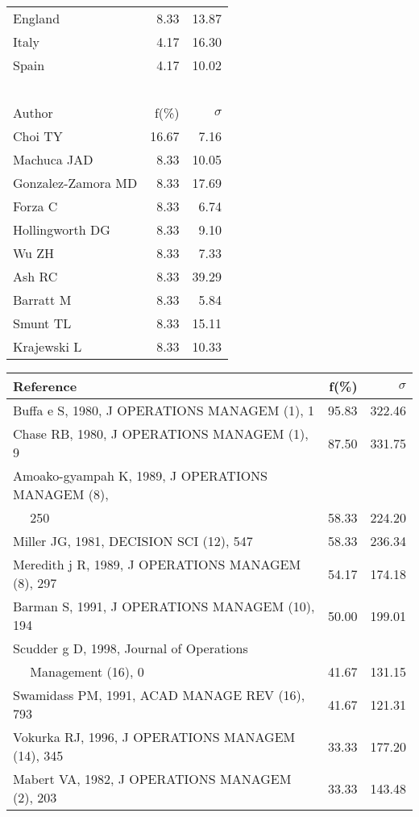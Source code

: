\documentclass[a4paper,11pt]{report}
\begin{document}
\begin{landscape}
\begin{table}[!ht]
{\begin{tabular}{|l r r|}
England & 8.33 & 13.87\\
Italy & 4.17 & 16.30\\
Spain & 4.17 & 10.02\\
 &  & \\
 &  & \\
 &  & \\
 &  & \\
 &  & \\
\hline
\hline
Author & f(\%) & $\sigma$\\
\hline
Choi TY & 16.67 & 7.16\\
Machuca JAD & 8.33 & 10.05\\
Gonzalez-Zamora MD & 8.33 & 17.69\\
Forza C & 8.33 & 6.74\\
Hollingworth DG & 8.33 & 9.10\\
Wu ZH & 8.33 & 7.33\\
Ash RC & 8.33 & 39.29\\
Barratt M & 8.33 & 5.84\\
Smunt TL & 8.33 & 15.11\\
Krajewski L & 8.33 & 10.33\\
\hline
\end{tabular}
}
{\scriptsize\begin{tabular}{|l r r|}
\hline
Reference & f(\%) & $\sigma$\\
\hline
Buffa e S, 1980, J OPERATIONS MANAGEM (1), 1 & 95.83 & 322.46\\
Chase RB, 1980, J OPERATIONS MANAGEM (1), 9 & 87.50 & 331.75\\
Amoako-gyampah K, 1989, J OPERATIONS MANAGEM (8), &  & \\
$\quad$ 250 & 58.33 & 224.20\\
Miller JG, 1981, DECISION SCI (12), 547 & 58.33 & 236.34\\
Meredith j R, 1989, J OPERATIONS MANAGEM (8), 297 & 54.17 & 174.18\\
Barman S, 1991, J OPERATIONS MANAGEM (10), 194 & 50.00 & 199.01\\
Scudder g D, 1998, Journal of Operations &  & \\
$\quad$ Management (16), 0 & 41.67 & 131.15\\
Swamidass PM, 1991, ACAD MANAGE REV (16), 793 & 41.67 & 121.31\\
Vokurka RJ, 1996, J OPERATIONS MANAGEM (14), 345 & 33.33 & 177.20\\
Mabert VA, 1982, J OPERATIONS MANAGEM (2), 203 & 33.33 & 143.48\\

\end{tabular}}
\end{table}
\end{landscape}
\end{document}

